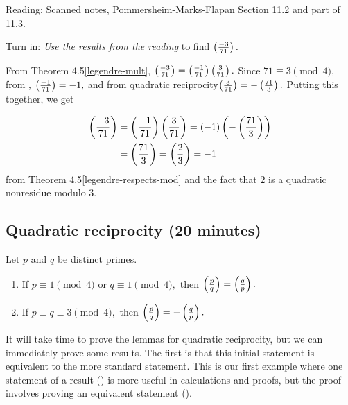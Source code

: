 \documentclass[letterpaper, 11 pt]{ximera}
\begin{document}
\begin{pre}
    \item[Reading:] Scanned notes, Pommersheim-Marks-Flapan Section 11.2 and part of 11.3.
    \item[Turn in:] \emph{Use the results from the reading} to find $\left(\frac{-3}{71}\right).$

     \begin{solution}
     	From Theorem 4.5\ref{legendre-mult}, $\left(\frac{-3}{71}\right)=\left(\frac{-1}{71}\right)\left(\frac{3}{71}\right).$
     	Since $71\equiv3\pmod{4},$ from , $\left(\frac{-1}{71}\right)=-1,$
	and from \hyperref[quad-rec-useful-form]{quadratic reciprocity}$\left(\frac{3}{71}\right)=-\left(\frac{71}{3}\right).$ Putting this together, we get
	
		\begin{align*}
		 	\left(\frac{-3}{71}\right)&=\left(\frac{-1}{71}\right)\left(\frac{3}{71}\right)=(-1)\left(-\left(\frac{71}{3}\right)\right)\\
				&=\left(\frac{71}{3}\right)=\left(\frac{2}{3}\right)=-1
		\end{align*}
	from Theorem 4.5\ref{legendre-respects-mod} and the fact that $2$ is a quadratic nonresidue modulo $3.$
     \end{solution}
\end{pre}


\subsection{Quadratic reciprocity (20 minutes)}

\begin{thm*}\label{quad-rec-useful-form}
	Let $p$ and $q$ be distinct primes.  
	\begin{enumerate}[label=(\alph*)]
		\item If $p\equiv 1 \pmod{4}$ or $q\equiv 1\pmod{4},$ then $\left(\frac{p}{q}\right)=\left(\frac{q}{p}\right).$
 		\item If $p\equiv q \equiv 3 \pmod{4},$ then $\left(\frac{p}{q}\right)=-\left(\frac{q}{p}\right).$
	\end{enumerate}
\end{thm*}

It will take time to prove the lemmas for quadratic reciprocity, but we can immediately prove some results. 
The first is that this initial statement is equivalent to the more standard statement. This is our first example where one statement of a result () is more useful in calculations and proofs, but the proof involves proving an equivalent statement ().
\end{document}
